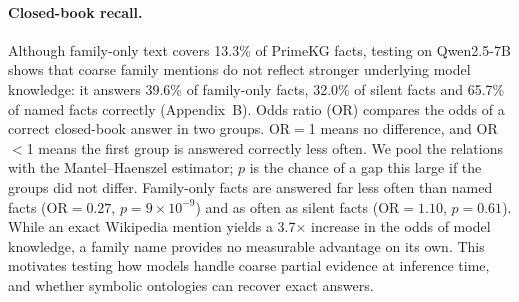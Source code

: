 


\paragraph{Closed-book recall.}
Although family-only text covers 13.3\% of PrimeKG facts, testing on Qwen2.5-7B shows that coarse family mentions do not reflect stronger underlying model knowledge: it answers 39.6\% of family-only facts, 32.0\% of silent facts and 65.7\% of named facts correctly (Appendix~B). Odds ratio (OR) compares the odds of a correct closed-book answer in two groups. OR$=$1 means no difference, and OR$<$1 means the first group is answered correctly less often. We pool the relations with the Mantel--Haenszel estimator; $p$ is the chance of a gap this large if the groups did not differ. Family-only facts are answered far less often than named facts ($\mathrm{OR}=0.27$, $p = 9\times10^{-9}$) and as often as silent facts ($\mathrm{OR}=1.10$, $p = 0.61$). While an exact Wikipedia mention yields a 3.7$\times$ increase in the odds of model knowledge, a family name provides no measurable advantage on its own. This motivates testing how models handle coarse partial evidence at inference time, and whether symbolic ontologies can recover exact answers.



